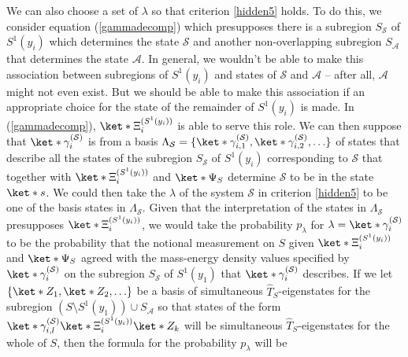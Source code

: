 \documentclass[12pt]{report}
\begin{document}
We can also choose a set of $\lambda$ so that criterion \ref{hidden5} holds. To do this, we consider equation (\ref{gammadecomp}) which presupposes there is a subregion $S_{\mathcal{S}}$ of $S^1(y_i)$ which determines the state $\mathcal{S}$ and another non-overlapping subregion $S_{\mathcal{A}}$ that determines the state $\mathcal{A}$. In general, we wouldn't be able to make this association between subregions of $S^1(y_i)$ and states of  $\mathcal{S}$  and $\mathcal{A}$ -- after all, $\mathcal{A}$ might not even exist. But we should be able to make this association if an appropriate choice for the state of the remainder of $S^1(y_i)$ is made. In (\ref{gammadecomp}), $\ket*{\Xi_i^{(S^1(y_i))}}$ is able to serve this role. We can then suppose that $\ket*{\gamma_i^{(\mathcal{S})}}$ is from a basis $\Lambda_{\mathcal{S}}=\{\ket*{\gamma_{i,1}^{(\mathcal{S})}},\ket*{\gamma_{i,2}^{(\mathcal{S})}},\ldots\}$%
%
 of states that describe all the states of the subregion $S_{\mathcal{S}}$ of $S^1(y_i)$ corresponding to $\mathcal{S}$ that together with $\ket*{\Xi_i^{(S^1(y_i))}}$ and $\ket*{\Psi_S}$ determine $\mathcal{S}$ to be in the state $\ket*{s}$. We could then take the $\lambda$ of the system $\mathcal{S}$ in criterion \ref{hidden5} to be one of the basis states in $\Lambda_{\mathcal{S}}$. Given that the interpretation of the states in $\Lambda_{\mathcal{S}}$ presupposes $\ket*{\Xi_i^{(S^1(y_i))}}$, we would take the probability $p_\lambda$ for $\lambda = \ket*{\gamma_i^{(\mathcal{S})}}$ to be the probability that the notional measurement on $S$ given $\ket*{\Xi_i^{(S^1(y_i))}}$ and $\ket*{\Psi_S}$ agreed with the mass-energy density values specified by $ \ket*{\gamma_i^{(\mathcal{S})}}$ on the subregion $S_{\mathcal{S}}$ of $S^1(y_1)$ that $ \ket*{\gamma_i^{(\mathcal{S})}}$ describes. If we let $\{\ket*{Z_1}, \ket*{Z_2},\ldots  \}$ %
  be a basis of simultaneous $\hat{T}_S$-eigenstates for the subregion $(S\setminus S^1(y_1))\cup S_{\mathcal{A}}$ so that states of the form $\ket*{\gamma_{i,l}^{(\mathcal{S})}}\ket*{\Xi_i^{(S^1(y_i))}}\ket*{Z_k}$ will be simultaneous $\hat{T}_S$-eigenstates for the whole of $S$, then the formula for the probability $p_\lambda$ will be 
\end{document}
